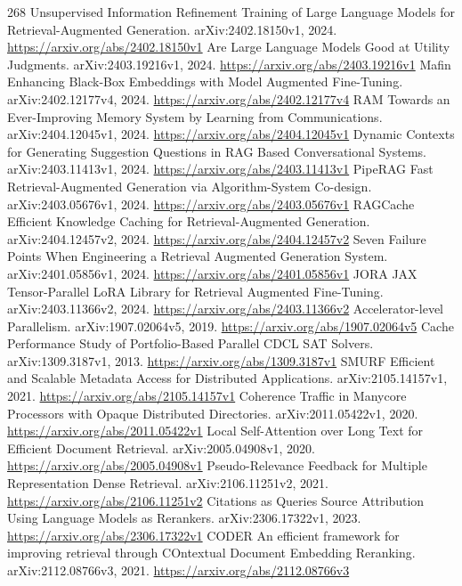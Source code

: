 \documentclass[11pt]{article}
\begin{document}
\begin{thebibliography}{268}
 Unsupervised Information Refinement Training of Large Language Models for Retrieval-Augmented Generation. arXiv:2402.18150v1, 2024. \url{https://arxiv.org/abs/2402.18150v1}
 Are Large Language Models Good at Utility Judgments. arXiv:2403.19216v1, 2024. \url{https://arxiv.org/abs/2403.19216v1}
 Mafin Enhancing Black-Box Embeddings with Model Augmented Fine-Tuning. arXiv:2402.12177v4, 2024. \url{https://arxiv.org/abs/2402.12177v4}
 RAM Towards an Ever-Improving Memory System by Learning from Communications. arXiv:2404.12045v1, 2024. \url{https://arxiv.org/abs/2404.12045v1}
 Dynamic Contexts for Generating Suggestion Questions in RAG Based Conversational Systems. arXiv:2403.11413v1, 2024. \url{https://arxiv.org/abs/2403.11413v1}
 PipeRAG Fast Retrieval-Augmented Generation via Algorithm-System Co-design. arXiv:2403.05676v1, 2024. \url{https://arxiv.org/abs/2403.05676v1}
 RAGCache Efficient Knowledge Caching for Retrieval-Augmented Generation. arXiv:2404.12457v2, 2024. \url{https://arxiv.org/abs/2404.12457v2}
 Seven Failure Points When Engineering a Retrieval Augmented Generation System. arXiv:2401.05856v1, 2024. \url{https://arxiv.org/abs/2401.05856v1}
 JORA JAX Tensor-Parallel LoRA Library for Retrieval Augmented Fine-Tuning. arXiv:2403.11366v2, 2024. \url{https://arxiv.org/abs/2403.11366v2}
 Accelerator-level Parallelism. arXiv:1907.02064v5, 2019. \url{https://arxiv.org/abs/1907.02064v5}
 Cache Performance Study of Portfolio-Based Parallel CDCL SAT Solvers. arXiv:1309.3187v1, 2013. \url{https://arxiv.org/abs/1309.3187v1}
 SMURF Efficient and Scalable Metadata Access for Distributed Applications. arXiv:2105.14157v1, 2021. \url{https://arxiv.org/abs/2105.14157v1}
 Coherence Traffic in Manycore Processors with Opaque Distributed Directories. arXiv:2011.05422v1, 2020. \url{https://arxiv.org/abs/2011.05422v1}
 Local Self-Attention over Long Text for Efficient Document Retrieval. arXiv:2005.04908v1, 2020. \url{https://arxiv.org/abs/2005.04908v1}
 Pseudo-Relevance Feedback for Multiple Representation Dense Retrieval. arXiv:2106.11251v2, 2021. \url{https://arxiv.org/abs/2106.11251v2}
 Citations as Queries Source Attribution Using Language Models as Rerankers. arXiv:2306.17322v1, 2023. \url{https://arxiv.org/abs/2306.17322v1}
 CODER An efficient framework for improving retrieval through COntextual Document Embedding Reranking. arXiv:2112.08766v3, 2021. \url{https://arxiv.org/abs/2112.08766v3}

\end{thebibliography}
\end{document}
